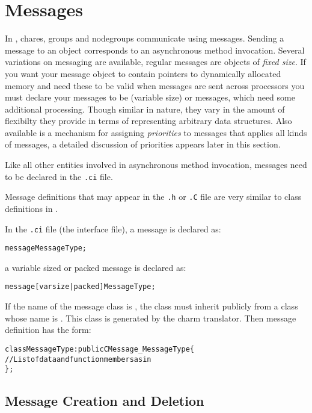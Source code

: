 \section{Messages}

In \charmpp, chares, groups and 
nodegroups communicate using messages. Sending a message  to an
object corresponds to an asynchronous method invocation.  Several variations on
messaging are available, regular \charmpp{} messages are objects of
\textit{fixed size}. If you want your message object to contain pointers to
dynamically allocated memory and need these to be valid when messages are sent
across processors you must declare your messages to be  (variable
size) or  messages, which need some additional processing. Though
similar in nature, they vary in the amount of flexibilty they provide in terms
of representing arbitrary data structures.  Also available is a mechanism for
assigning \textit{priorities} to messages that applies all kinds of messages, a
detailed discussion of priorities appears later in this section.

Like all other entities involved in asynchronous method invocation, messages
need to be declared in the {\tt .ci} file.

Message definitions that may appear in the {\tt .h} or {\tt .C} file are very
similar to class definitions in \CC.

In the {\tt .ci} file (the interface file), a message is declared as: 

\begin{alltt}
 message MessageType;
\end{alltt}

a variable sized or packed message is declared as:

\begin{alltt}
 message [varsize|packed] MessageType;
\end{alltt}


If the name of the message class is , the class must inherit 
publicly from a class whose name is . This class
is generated by the charm translator. Then message definition has the form:

\begin{alltt}
 class MessageType : public CMessage_MessageType \{
    // List of data and function members as in \CC
 \};
\end{alltt}


\subsection{Message Creation and Deletion}
\label{memory allocation}

